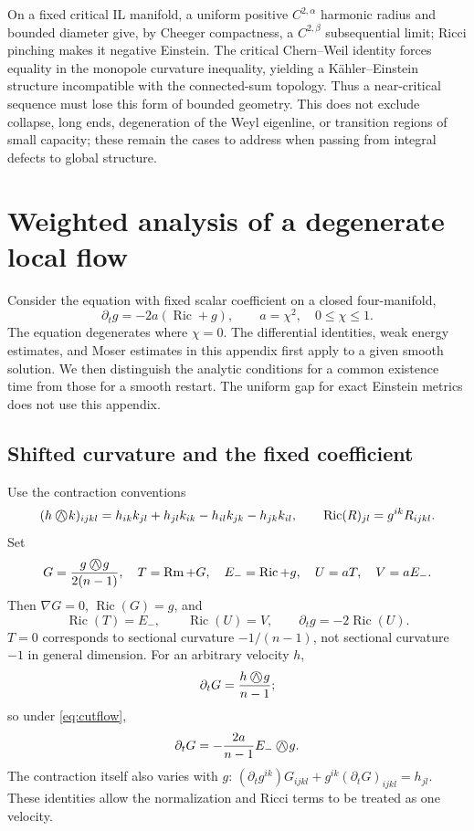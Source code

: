 \documentclass[a4paper,11pt]{article}
\numberwithin{equation}{section}
\theoremstyle{definition}
\newcommand{\Ric}{\operatorname{Ric}}
\newcommand{\Rm}{\operatorname{Rm}}
\newcommand{\owedge}{\mathbin{\bigcirc\mkern-15mu\wedge}}
\begin{document}
On a fixed critical IL manifold, a uniform positive $C^{2,\alpha}$ harmonic radius and bounded diameter
give, by Cheeger compactness, a $C^{2,\beta}$ subsequential limit; Ricci pinching makes it negative Einstein.
The critical Chern--Weil identity forces equality in the monopole curvature inequality, yielding a K\"ahler--Einstein structure incompatible with the connected-sum topology.
Thus a near-critical sequence must lose this form of bounded geometry.
This does not exclude collapse, long ends, degeneration of the Weyl eigenline, or transition regions of small capacity; these remain the cases to address when passing from integral defects to global structure.


\appendix
\section{Weighted analysis of a degenerate local flow}\label{app:flow}
Consider the equation with fixed scalar coefficient on a closed four-manifold,
\begin{equation}\label{eq:cutflow}
\partial_tg=-2a(\Ric+g),\qquad a=\chi^2,\quad 0\le\chi\le1.
\end{equation}
The equation degenerates where $\chi=0$. The differential identities, weak energy estimates, and Moser estimates in this appendix first apply to a given smooth solution. We then distinguish the analytic conditions for a common existence time from those for a smooth restart. The uniform gap for exact Einstein metrics does not use this appendix.

\subsection{Shifted curvature and the fixed coefficient}
Use the contraction conventions
\[
(h\owedge k)_{ijkl}=h_{ik}k_{jl}+h_{jl}k_{ik}-h_{il}k_{jk}-h_{jk}k_{il},
\qquad \Ric(R)_{jl}=g^{ik}R_{ijkl}.
\]
Set
\[
G=\frac{g\owedge g}{2(n-1)},\quad T=\Rm+G,\quad
E_-=\Ric+g,\quad U=aT,\quad V=aE_-.
\]
Then $\nabla G=0$, $\Ric(G)=g$, and
\begin{equation}\label{eq:shift-contract}
\Ric(T)=E_-,\qquad \Ric(U)=V,\qquad \partial_tg=-2\Ric(U).
\end{equation}
$T=0$ corresponds to sectional curvature $-1/(n-1)$, not sectional curvature $-1$ in general dimension. For an arbitrary velocity $h$,
\[
\partial_tG=\frac{h\owedge g}{n-1};
\]
so under \eqref{eq:cutflow},
\[
\partial_tG=-\frac{2a}{n-1}E_-\owedge g.
\]
The contraction itself also varies with $g$:
$(\partial_tg^{ik})G_{ijkl}+g^{ik}(\partial_tG)_{ijkl}=h_{jl}$.
These identities allow the normalization and Ricci terms to be treated as one velocity.
\end{document}
